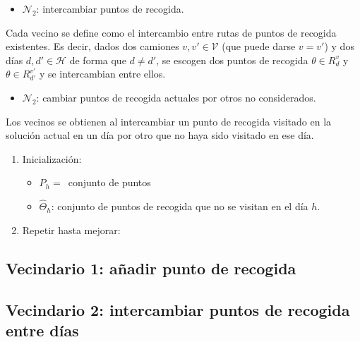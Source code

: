 \documentclass[
]{article}
\providecommand{\tightlist}{%
  \setlength{\itemsep}{0pt}\setlength{\parskip}{0pt}}
\begin{document}
\begin{itemize}
\tightlist
\item
  \(\mathcal{N}_2\): intercambiar puntos de recogida.
\end{itemize}

Cada vecino se define como el intercambio entre rutas de puntos de
recogida existentes. Es decir, dados dos camiones
\(v, v'\in \mathcal{V}\) (que puede darse \(v = v'\)) y dos días
\(d, d' \in \mathcal{H}\) de forma que \(d\neq d'\), se escogen dos
puntos de recogida \(\theta\in R_{d}^v\) y \(\theta\in R_{d'}^{v'}\) y
se intercambian entre ellos.

\begin{itemize}
\tightlist
\item
  \(\mathcal{N}_2\): cambiar puntos de recogida actuales por otros no
  considerados.
\end{itemize}

Los vecinos se obtienen al intercambiar un punto de recogida visitado en
la solución actual en un día por otro que no haya sido visitado en ese
día.

\begin{enumerate}
\def\labelenumi{\arabic{enumi}.}
\tightlist
\item
  Inicialización:

  \begin{itemize}
  \tightlist
  \item
    \(P_h=\,\) conjunto de puntos
  \item
    \(\hat{\Theta}_h\): conjunto de puntos de recogida que no se visitan
    en el día \(h\).
  \end{itemize}
\item
  Repetir hasta mejorar:
\end{enumerate}

\hypertarget{vecindario-1-auxf1adir-punto-de-recogida}{%
\subsection{Vecindario 1: añadir punto de
recogida}\label{vecindario-1-auxf1adir-punto-de-recogida}}

\hypertarget{vecindario-2-intercambiar-puntos-de-recogida-entre-duxedas}{%
\subsection{Vecindario 2: intercambiar puntos de recogida entre
días}\label{vecindario-2-intercambiar-puntos-de-recogida-entre-duxedas}}
\end{document}
